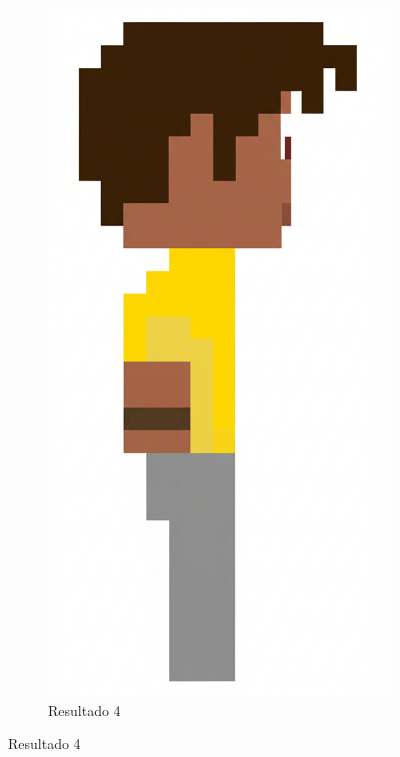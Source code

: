 \begin{figure}[htbp]
\begin{subfigure}{0.22\linewidth}
        \includegraphics[width=1\linewidth]{figs/geminiPro/chat1/res4_tela1.png}
        \caption{\small Resultado 4}
        \label{fig:geminiPro1d}
    \end{subfigure}
\end{figure}

